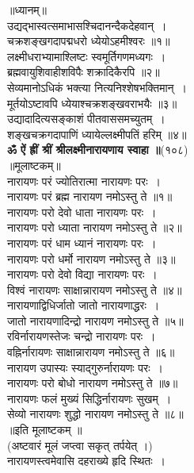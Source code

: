 \documentclass[twoside,top=1.7cm, bottom=1.7cm, outer=1cm,landscape, inner=1.5cm,a5paper,]{book}
\begin{document}
\begin{center}
॥ध्यानम्॥\\
उद्यद्भास्वत्समाभासश्चिदानन्दैकदेहवान्~।\\
चक्रशङ्खगदापद्मधरो ध्येयोऽहमीश्वरः ॥१॥\\[10pt]
लक्ष्मीधराभ्यामाश्लिष्टः स्वमूर्तिगणमध्यगः~।\\
ब्रह्मवायुशिवाहीशविपैः शक्रादिकैरपि ॥२॥\\[10pt]
सेव्यमानोऽधिकं भक्त्या नित्यनिश्शेषभक्तिमान्~।\\
मूर्तयोऽष्टावपि ध्येयाश्चक्रशङ्खवराभयैः ॥३॥\\[10pt]
\newpage
उद्यादादित्यसङ्काशं पीतवाससमच्युतम्~।\\
शङ्खचक्रगदापाणिं ध्यायेल्लक्ष्मीपतिं हरिम् ॥४॥\\[10pt]
{\bfseries ॐ ऐं ह्रीं श्रीं श्रीलक्ष्मीनारायणाय स्वाहा ॥}(१०८)\\
॥मूलाष्टकम्॥\\
नारायणः परं ज्योतिरात्मा नारायणः परः~।\\
नारायणः परं ब्रह्म नारायण नमोऽस्तु ते ॥१॥\\[10pt]
नारायणः परो देवो धाता नारायणः परः~।\\
नारायणः परो ध्याता नारायण नमोऽस्तु ते ॥२॥\\[10pt]
\newpage
नारायणः परं धाम ध्यानं नारायणः परः~।\\
नारायणः परो धर्मो नारायण नमोऽस्तु ते ॥३॥\\[10pt]
नारायणः परो देवो विद्या नारायणः परः~।\\
विश्वं नारायणः साक्षान्नारायण नमोऽस्तु ते ॥४॥\\[10pt]
नारायणाद्विधिर्जातो जातो नारायणाद्धरः~।\\
जातो नारायणादिन्द्रो नारायण नमोऽस्तु ते ॥५॥\\[10pt]
रविर्नारायणस्तेजः चन्द्रो नारायणः परः~।\\
वह्निर्नारायणः साक्षान्नारायण नमोऽस्तु ते ॥६॥\\[10pt]
\newpage
नारायण उपास्यः स्याद्गुरुर्नारायणः परः~।\\
नारायणः परो बोधो नारायण नमोऽस्तु ते ॥७‍॥\\[10pt]
नारायणः फलं मुख्यं सिद्धिर्नारायणः सुखम्~।\\
सेव्यो नारायणः शुद्धो नारायण नमोऽस्तु ते ॥८॥\\
॥इति मूलाष्टकम् ॥\\
(अष्टवारं मूलं जप्त्वा सकृत्  तर्पयेत् ।)\\[10pt]
नारायणस्त्वमेवासि दहराख्ये हृदि स्थितः~।\\

\end{center}
\end{document}
